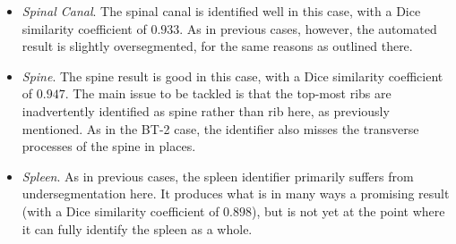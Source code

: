 \begin{itemize}
\item \emph{Spinal Canal}. The spinal canal is identified well in this case, with a Dice similarity coefficient of $0.933$. As in previous cases, however, the automated result is slightly oversegmented, for the same reasons as outlined there.

\item \emph{Spine}. The spine result is good in this case, with a Dice similarity coefficient of $0.947$. The main issue to be tackled is that the top-most ribs are inadvertently identified as spine rather than rib here, as previously mentioned. As in the BT-2 case, the identifier also misses the transverse processes of the spine in places.

\item \emph{Spleen}. As in previous cases, the spleen identifier primarily suffers from undersegmentation here. It produces what is in many ways a promising result (with a Dice similarity coefficient of $0.898$), but is not yet at the point where it can fully identify the spleen as a whole.

\end{itemize}


